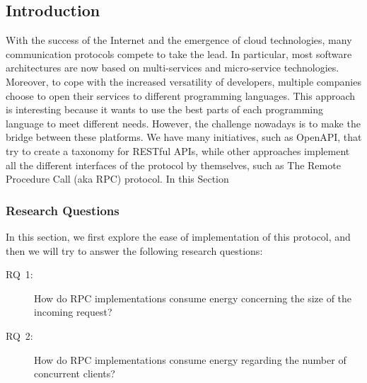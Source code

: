 \subsection{Introduction}
With the success of the Internet and the emergence of cloud technologies, many communication protocols compete to take the lead.
In particular, most software architectures are now based on multi-services and micro-service technologies.
Moreover, to cope with the increased versatility of developers, multiple companies choose to open their services to different programming languages.
This approach is interesting because it wants to use the best parts of each programming language to meet different needs.
However, the challenge nowadays is to make the bridge between these platforms.
We have many initiatives, such as OpenAPI, that try to create a taxonomy for RESTful APIs, while other approaches implement all the different interfaces of the protocol by themselves, such as The Remote Procedure Call (aka RPC) protocol.
In this Section 

\subsubsection{Research Questions}
In this section, we first explore the ease of implementation of this protocol, and then we will try to answer the following research questions:
\begin{description}
    \item[\textsc{RQ}~1:] How do RPC implementations consume energy concerning the size of the incoming request?
    \item[\textsc{RQ}~2:] How do RPC implementations consume energy regarding the number of concurrent clients?
\end{description}

